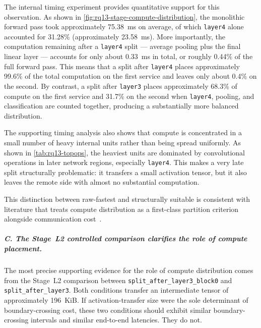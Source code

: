 The internal timing experiment provides quantitative support for this observation. As shown in \cref{fig:rq13-stage-compute-distribution}, the monolithic forward pass took approximately 75.38~ms on average, of which \texttt{layer4} alone accounted for 31.28\% (approximately 23.58~ms). More importantly, the computation remaining after a \texttt{layer4} split --- average pooling plus the final linear layer --- accounts for only about 0.33~ms in total, or roughly 0.44\% of the full forward pass. This means that a split after \texttt{layer4} places approximately 99.6\% of the total computation on the first service and leaves only about 0.4\% on the second. By contrast, a split after \texttt{layer3} places approximately 68.3\% of compute on the first service and 31.7\% on the second when \texttt{layer4}, pooling, and classification are counted together, producing a substantially more balanced distribution.

The supporting timing analysis also shows that compute is concentrated in a small number of heavy internal units rather than being spread uniformly. As shown in \cref{tab:rq13-topops}, the heaviest units are dominated by convolutional operations in later network regions, especially \texttt{layer4}. This makes a very late split structurally problematic: it transfers a small activation tensor, but it also leaves the remote side with almost no substantial computation.

This distinction between raw-fastest and structurally suitable is consistent with literature that treats compute distribution as a first-class partition criterion alongside communication cost~\cite{dnnsplit, dads, pareto_split, bottlefit}.

\subparagraph{C. The Stage~L2 controlled comparison clarifies the role of compute placement.}

The most precise supporting evidence for the role of compute distribution comes from the Stage~L2 comparison between \texttt{split\_after\_layer3\_block0} and \texttt{split\_after\_layer3}. Both conditions transfer an intermediate tensor of approximately 196~KiB. If activation-transfer size were the sole determinant of boundary-crossing cost, these two conditions should exhibit similar boundary-crossing intervals and similar end-to-end latencies. They do not.


